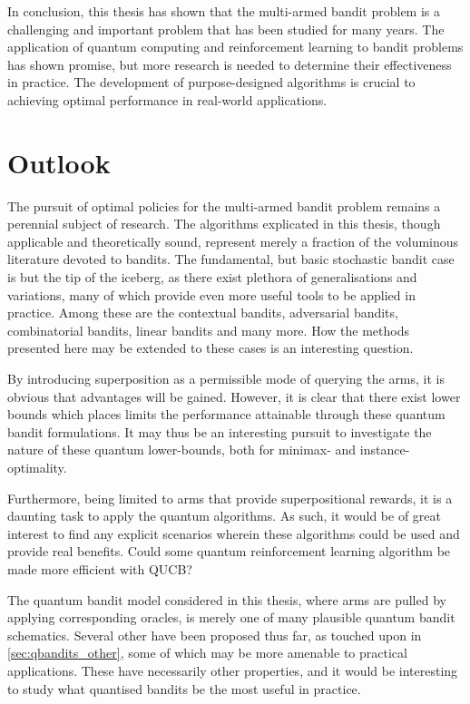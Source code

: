 In conclusion, this thesis has shown that the multi-armed bandit problem is a challenging and important problem that has been studied for many years.
The application of quantum computing and reinforcement learning to bandit problems has shown promise, but more research is needed to determine their effectiveness in practice.
The development of purpose-designed algorithms is crucial to achieving optimal performance in real-world applications.

\section{Outlook}
The pursuit of optimal policies for the multi-armed bandit problem remains a perennial subject of research.
The algorithms explicated in this thesis, though applicable and theoretically sound, represent merely a fraction of the voluminous literature devoted to bandits.
The fundamental, but basic stochastic bandit case is but the tip of the iceberg, as there exist plethora of generalisations and variations, many of which provide even more useful tools to be applied in practice.
Among these are the contextual bandits, adversarial bandits, combinatorial bandits, linear bandits and many more.
How the methods presented here may be extended to these cases is an interesting question.

By introducing superposition as a permissible mode of querying the arms, it is obvious that advantages will be gained.
However, it is clear that there exist lower bounds which places limits the performance attainable through these quantum bandit formulations.
It may thus be an interesting pursuit to investigate the nature of these quantum lower-bounds, both for minimax- and instance-optimality.

Furthermore, being limited to arms that provide superpositional rewards, it is a daunting task to apply the quantum algorithms.
As such, it would be of great interest to find any explicit scenarios wherein these algorithms could be used and provide real benefits.
Could some quantum reinforcement learning algorithm be made more efficient with QUCB?

The quantum bandit model considered in this thesis, where arms are pulled by applying corresponding oracles, is merely one of many plausible quantum bandit schematics.
Several other have been proposed thus far, as touched upon in \cref{sec:qbandits_other}, some of which may be more amenable to practical applications.
These have necessarily other properties, and it would be interesting to study what quantised bandits be the most useful in practice.

